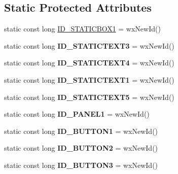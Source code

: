 \subsection*{Static Protected Attributes}
\begin{DoxyCompactItemize}
\item 
static const long \hyperlink{class_detail_dialog_abed1d78f4aa5a1f0d57364604462adb3}{I\-D\-\_\-\-S\-T\-A\-T\-I\-C\-B\-O\-X1} = wx\-New\-Id()
\item 
\hypertarget{class_detail_dialog_a8e723de7467321b855d6a9d113df4e55}{static const long {\bfseries I\-D\-\_\-\-S\-T\-A\-T\-I\-C\-T\-E\-X\-T3} = wx\-New\-Id()}\label{class_detail_dialog_a8e723de7467321b855d6a9d113df4e55}

\item 
\hypertarget{class_detail_dialog_a0772eec8444ca8ed510afe21a0c12342}{static const long {\bfseries I\-D\-\_\-\-S\-T\-A\-T\-I\-C\-T\-E\-X\-T4} = wx\-New\-Id()}\label{class_detail_dialog_a0772eec8444ca8ed510afe21a0c12342}

\item 
\hypertarget{class_detail_dialog_a35b8def37c9fcb69bd3bacbab15803e6}{static const long {\bfseries I\-D\-\_\-\-S\-T\-A\-T\-I\-C\-T\-E\-X\-T1} = wx\-New\-Id()}\label{class_detail_dialog_a35b8def37c9fcb69bd3bacbab15803e6}

\item 
\hypertarget{class_detail_dialog_a0cd6d945f5f7e3a128fda2461c8472cc}{static const long {\bfseries I\-D\-\_\-\-S\-T\-A\-T\-I\-C\-T\-E\-X\-T5} = wx\-New\-Id()}\label{class_detail_dialog_a0cd6d945f5f7e3a128fda2461c8472cc}

\item 
\hypertarget{class_detail_dialog_af55176f0dac7fcf7cab91a05086016e9}{static const long {\bfseries I\-D\-\_\-\-P\-A\-N\-E\-L1} = wx\-New\-Id()}\label{class_detail_dialog_af55176f0dac7fcf7cab91a05086016e9}

\item 
\hypertarget{class_detail_dialog_a62761535becea9e8e833683702c28f3d}{static const long {\bfseries I\-D\-\_\-\-B\-U\-T\-T\-O\-N1} = wx\-New\-Id()}\label{class_detail_dialog_a62761535becea9e8e833683702c28f3d}

\item 
\hypertarget{class_detail_dialog_adeb0db3c34824232f3f2c5554b068180}{static const long {\bfseries I\-D\-\_\-\-B\-U\-T\-T\-O\-N2} = wx\-New\-Id()}\label{class_detail_dialog_adeb0db3c34824232f3f2c5554b068180}

\item 
\hypertarget{class_detail_dialog_afda7240a12907c289f3fa2166edb4398}{static const long {\bfseries I\-D\-\_\-\-B\-U\-T\-T\-O\-N3} = wx\-New\-Id()}\label{class_detail_dialog_afda7240a12907c289f3fa2166edb4398}


\end{DoxyCompactItemize}
